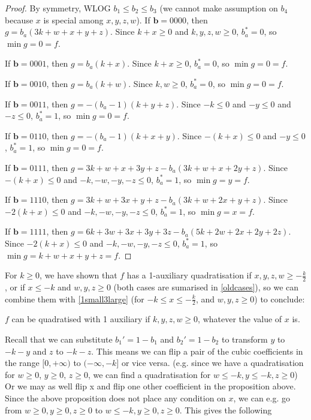 \documentclass[11pt]{scrartcl}
\newcommand{\vc}[1]{\boldsymbol{#1}}
\begin{document}
\begin{proof}
	By symmetry, WLOG $b_1 \le b_2 \le b_3$ (we cannot make assumption on $b_4$ because $x$ is special among $x, y, z, w$).
If $\vc b = 0000$, then $g = b_a(3k + w + x + y + z)$. Since $k + x \ge 0 $ and $k, y, z, w \ge 0$, $b_a^* = 0$, so $\min g = 0 = f$.

If $\vc b = 0001$, then $g = b_a(k + x)$. Since $k + x\ge 0$, $b_a^* = 0$, so $\min g = 0 = f$.

If $\vc b = 0010$, then $g = b_a(k + w)$. Since $k, w \ge 0$, $b_a^* = 0$, so $\min g = 0 = f$.

If $\vc b = 0011$, then $g = -(b_a - 1)(k + y + z)$. Since $-k \le 0$ and $-y \le 0$ and $-z \le 0$, $b_a^* = 1$, so $\min g = 0 = f$.

If $\vc b = 0110$, then $g = -(b_a - 1)(k + x + y)$. Since $-(k+x) \le 0$ and $-y \le 0$, $b_a^* = 1$, so $\min g = 0 = f$.

If $\vc b = 0111$, then $g = 3k + w + x + 3y + z - b_a(3k + w + x + 2y + z)$.
Since $-(k+x) \le 0$ and $-k, -w, -y, -z \le 0$, $b_a^* = 1$, so $\min g = y = f$.

If $\vc b = 1110$, then $g = 3k + w + 3x + y + z - b_a(3k + w + 2x + y + z)$.
Since $-2(k+x) \le 0$ and $-k, -w, -y, -z \le 0$, $b_a^* = 1$, so $\min g = x = f$.

If $\vc b = 1111$, then $g = 6k + 3w + 3x + 3y + 3z - b_a(5k + 2w + 2x + 2y + 2z)$.
Since $-2(k+x) \le 0$ and $-k, -w, -y, -z \le 0$, $b_a^* = 1$, so $\min g = k+ w+ x + y + z = f$.
\end{proof}

For $k \ge 0$, we have shown that $f$ has a 1-auxiliary quadratisation if  $x, y, z, w \ge -\frac{k}{2}$, 
or if $x\le -k$ and $w, y, z \ge 0$ (both cases are sumarised in \ref{oldcases}), so we can combine them 
with \ref{1small3large} (for $-k\le x \le -\frac{k}{2}$, and $w, y, z \ge 0$) to conclude:
\begin{proposition}
$f$ can be quadratised with 1 auxiliary if $k, y, z, w \ge 0$, whatever the value of $x$ is.
\end{proposition}

Recall that we can substitute $b_1'=1-b_1$ and $b_2'=1-b_2$ to transform $y$ to $ -k-y $ and $z$ to $-k-z$. This means we can flip a pair of the cubic coefficients in the range $[0, +\infty)$ to $(-\infty, -k]$ or vice versa. (e.g. since we have a quadratisation for $w \ge 0$, $y \ge 0$, $z\ge 0$,
we can find a quadratisation for $w\le -k, y \le -k, z \ge 0$) 
Or we may as well flip x and flip one other coefficient in the proposition above. Since the above proposition does not place any condition on $x$, we can e.g. go from  $w\ge 0, y\ge 0, z\ge 0$ to $w\le -k, y\ge 0, z\ge 0$. This gives the following
\end{document}
